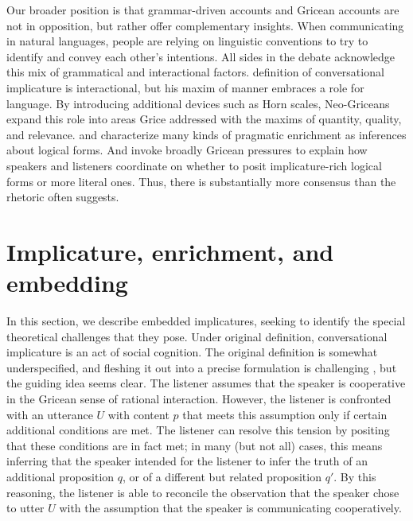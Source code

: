 \documentclass[leqno,12pt]{article}
\begin{document}
Our broader position is that grammar-driven accounts and Gricean
accounts are not in opposition, but rather offer complementary
insights.  When communicating in natural languages, people are relying
on linguistic conventions to try to identify and convey each other's
intentions. All sides in the debate acknowledge this mix of
grammatical and interactional factors.  definition
of conversational implicature is interactional, but his maxim of
manner embraces a role for language. By introducing additional devices
such as Horn scales, Neo-Griceans expand this role into areas Grice
addressed with the maxims of quantity, quality, and
relevance. \citet{Sperber95} and \citet{Bach94} characterize many
kinds of pragmatic enrichment as inferences about logical forms. And
\citet{ChierchiaFoxSpector08} invoke broadly Gricean pressures to
explain how speakers and listeners coordinate on whether to posit
implicature-rich logical forms or more literal ones. Thus, there is
substantially more consensus than the rhetoric often suggests.


\section{Implicature, enrichment, and embedding}\label{sec:implicature}


In this section, we describe embedded implicatures, seeking to
identify the special theoretical challenges that they pose.  Under
 original definition, conversational implicature is
an act of social cognition. The original definition is somewhat
underspecified, and fleshing it out into a precise formulation is
challenging \citep{Hirschberg85}, but the guiding idea seems clear.
The listener assumes that the speaker is cooperative in the Gricean
sense of rational interaction. However, the listener is confronted
with an utterance $U$ with content $p$ that meets this assumption only
if certain additional conditions are met. The listener can resolve
this tension by positing that these conditions are in fact met; in
many (but not all) cases, this means inferring that the speaker
intended for the listener to infer the truth of an additional
proposition $q$, or of a different but related proposition $q'$. By
this reasoning, the listener is able to reconcile the observation that
the speaker chose to utter $U$ with the assumption that the speaker is
communicating cooperatively.
\end{document}
